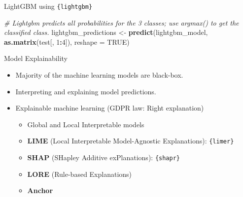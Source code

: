 \documentclass[12pt,ignorenonframetext,]{beamer}
\newenvironment{Shaded}{\begin{snugshade}}{\end{snugshade}}
\newcommand{\CommentTok}[1]{\textcolor[rgb]{0.56,0.35,0.01}{\textit{#1}}}
\newcommand{\DataTypeTok}[1]{\textcolor[rgb]{0.13,0.29,0.53}{#1}}
\newcommand{\DecValTok}[1]{\textcolor[rgb]{0.00,0.00,0.81}{#1}}
\newcommand{\KeywordTok}[1]{\textcolor[rgb]{0.13,0.29,0.53}{\textbf{#1}}}
\newcommand{\NormalTok}[1]{#1}
\newcommand{\OperatorTok}[1]{\textcolor[rgb]{0.81,0.36,0.00}{\textbf{#1}}}
\newcommand{\OtherTok}[1]{\textcolor[rgb]{0.56,0.35,0.01}{#1}}
\newcommand{\StringTok}[1]{\textcolor[rgb]{0.31,0.60,0.02}{#1}}
\providecommand{\tightlist}{%
  \setlength{\itemsep}{0pt}\setlength{\parskip}{0pt}}
\begin{document}
\begin{frame}[fragile]{LightGBM using \texttt{\{lightgbm\}}}
\begin{Shaded}
\begin{Highlighting}[]
\CommentTok{# Lightgbm predicts all probabilities for the 3 classes; use argmax() to get the classified class.}
\NormalTok{lightgbm_predictions <-}\StringTok{ }\KeywordTok{predict}\NormalTok{(lightgbm_model, }\KeywordTok{as.matrix}\NormalTok{(test[, }\DecValTok{1}\OperatorTok{:}\DecValTok{4}\NormalTok{]), }\DataTypeTok{reshape =} \OtherTok{TRUE}\NormalTok{)}
\end{Highlighting}
\end{Shaded}

\normalsize

\end{frame}

\begin{frame}{Model Explainability}
\protect\hypertarget{model-explainability}{}

\begin{itemize}
\tightlist
\item
  Majority of the machine learning models are black-box. \vspace{2mm}
\item
  Interpreting and explaining model predictions. \vspace{2mm}
\item
  Explainable machine learning (GDPR law: Right explanation)
  \vspace{2mm}

  \begin{itemize}
      \item Global and Local Interpretable models
      \item \textbf{LIME} (Local Interpretable Model-Agnostic Explanations): \texttt{\{limer\}}
      \item \textbf{SHAP} (SHapley Additive exPlanations): \texttt{\{shapr\}}
      \item \textbf{LORE} (Rule-based Explanations)
      \item \textbf{Anchor}
  \end{itemize}
\end{itemize}

\end{frame}
\end{document}
